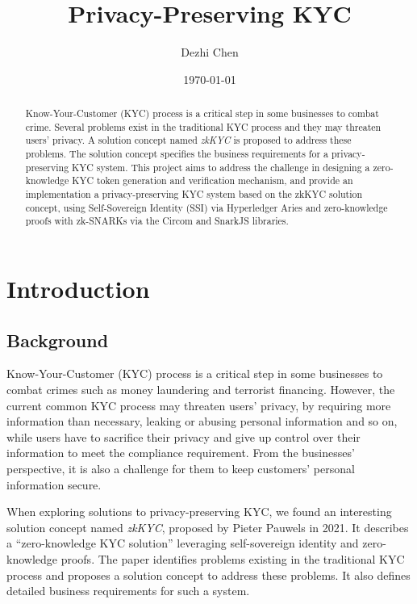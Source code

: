 \documentclass[
]{report}
\title{Privacy-Preserving KYC}
\author{Dezhi Chen}
\date{\today}
\begin{document}
\maketitle
\tableofcontents

\begin{abstract}
Know-Your-Customer (KYC) process is a
critical step in some businesses to combat crime. Several problems exist
in the traditional KYC process and they may threaten users' privacy. A
solution concept named \emph{zkKYC} is proposed to address these
problems. The solution concept specifies the business requirements for a
privacy-preserving KYC system. This project aims to address the
challenge in designing a zero-knowledge KYC token generation and
verification mechanism, and provide an implementation a
privacy-preserving KYC system based on the zkKYC solution concept, using
Self-Sovereign Identity (SSI) via Hyperledger Aries and zero-knowledge
proofs with zk-SNARKs via the Circom and SnarkJS libraries.
\end{abstract}

\chapter{Introduction}

\section{Background}

Know-Your-Customer (KYC) process is a critical step in some businesses
to combat crimes such as money laundering and terrorist financing.
However, the current common KYC process may threaten users' privacy, by
requiring more information than necessary, leaking or abusing personal
information and so on, while users have to sacrifice their privacy and
give up control over their information to meet the compliance
requirement. From the businesses' perspective, it is also a challenge
for them to keep customers' personal information secure.

When exploring solutions to privacy-preserving KYC, we found an
interesting solution concept named \emph{zkKYC}, proposed by Pieter
Pauwels in 2021. It describes a ``zero-knowledge KYC solution''
leveraging self-sovereign identity and zero-knowledge proofs. The paper
identifies problems existing in the traditional KYC process and proposes
a solution concept to address these problems. It also defines detailed
business requirements for such a system.
\end{document}
